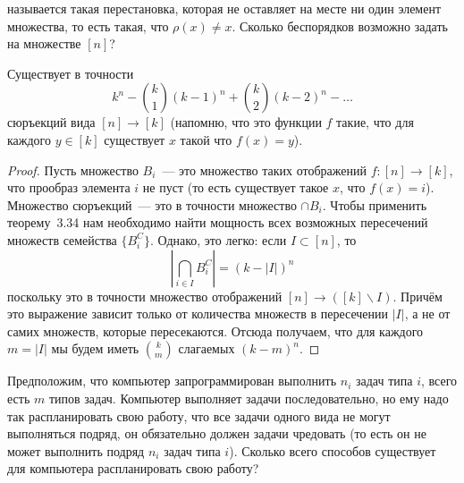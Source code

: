 \begin{exercise}
 называется такая перестановка, которая не оставляет на месте ни один элемент множества, то есть такая, что $\rho(x)\not=x$. Сколько беспорядков возможно задать на множестве $[n]$?
\end{exercise}

\begin{thm}
Существует в точности
$$k^n - {k \choose 1}(k-1)^n + {k\choose 2}(k-2)^n -\ldots$$
сюръекций вида $[n]\to[k]$ (напомню, что это функции $f$ такие, что для каждого $y\in[k]$ существует $x$ такой что $f(x) = y$).
\end{thm}
\begin{proof}
Пусть множество $B_i$~--- это множество таких отображений $f:[n]\to[k]$, что прообраз элемента $i$ не пуст (то есть существует такое $x$, что $f(x) = i$). Множество сюръекций~--- это в точности множество $\cap B_i$. Чтобы применить теорему~3.34 нам необходимо найти мощность всех возможных пересечений множеств семейства $\{B_i^C\}$. Однако, это легко: если $I\subset [n]$, то
$$\left|\bigcap_{i\in I} B_i^C\right| = (k-|I|)^n$$
поскольку это в точности множество отображений $[n]\to([k]\backslash I)$. Причём это выражение зависит только от количества множеств в пересечении $|I|$, а не от самих множеств, которые пересекаются. Отсюда получаем, что для каждого $m = |I|$ мы будем иметь $k\choose m$ слагаемых $(k-m)^n$.
\end{proof}

\begin{exercise}
Предположим, что компьютер запрограммирован выполнить $n_i$ задач типа $i$, всего есть $m$ типов задач. Компьютер выполняет задачи последовательно, но ему надо так распланировать свою работу, что все задачи одного вида не могут выполняться подряд, он обязательно должен задачи чредовать (то есть он не может выполнить подряд $n_i$ задач типа $i$). Сколько всего способов существует для компьютера распланировать свою работу?
\end{exercise}